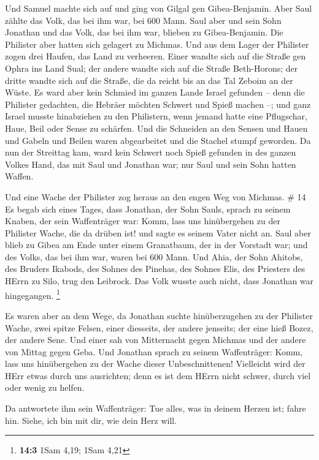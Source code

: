  Und Samuel machte sich auf und ging von Gilgal gen
Gibea-Benjamin. Aber Saul zählte das Volk, das bei ihm war, bei 600
Mann.  Saul aber und sein Sohn Jonathan und das Volk, das
bei ihm war, blieben zu Gibea-Benjamin. Die Philister aber hatten sich
gelagert zu Michmas.  Und aus dem Lager der Philister zogen
drei Haufen, das Land zu verheeren. Einer wandte sich auf die Straße gen
Ophra ins Land Sual;  der andere wandte sich auf die Straße
Beth-Horons; der dritte wandte sich auf die Straße, die da reicht bis an
das Tal Zeboim an der Wüste.  Es ward aber kein Schmied im
ganzen Lande Israel gefunden -- denn die Philister gedachten, die
Hebräer möchten Schwert und Spieß machen --;  und ganz
Israel musste hinabziehen zu den Philistern, wenn jemand hatte eine
Pflugschar, Haue, Beil oder Sense zu schärfen.  Und die
Schneiden an den Sensen und Hauen und Gabeln und Beilen waren
abgearbeitet und die Stachel stumpf geworden.  Da nun der
Streittag kam, ward kein Schwert noch Spieß gefunden in des ganzen
Volkes Hand, das mit Saul und Jonathan war; nur Saul und sein Sohn
hatten Waffen.

 Und eine Wache der Philister zog heraus an den engen Weg
von Michmas. \# 14  Es begab sich eines Tages, dass
Jonathan, der Sohn Sauls, sprach zu seinem Knaben, der sein Waffenträger
war: Komm, lass uns hinübergehen zu der Philister Wache, die da drüben
ist! und sagte es seinem Vater nicht an.  Saul aber blieb zu
Gibea am Ende unter einem Granatbaum, der in der Vorstadt war; und des
Volks, das bei ihm war, waren bei 600 Mann.  Und Ahia, der
Sohn Ahitobs, des Bruders Ikabods, des Sohnes des Pinehas, des Sohnes
Elis, des Priesters des HErrn zu Silo, trug den Leibrock. Das Volk
wusste auch nicht, dass Jonathan war hingegangen. \footnote{\textbf{14:3}
  1Sam 4,19; 1Sam 4,21}

 Es waren aber an dem Wege, da Jonathan suchte
hinüberzugehen zu der Philister Wache, zwei spitze Felsen, einer
diesseits, der andere jenseits; der eine hieß Bozez, der andere Sene.
 Und einer sah von Mitternacht gegen Michmas und der andere
von Mittag gegen Geba.  Und Jonathan sprach zu seinem
Waffenträger: Komm, lass uns hinübergehen zu der Wache dieser
Unbeschnittenen! Vielleicht wird der HErr etwas durch uns ausrichten;
denn es ist dem HErrn nicht schwer, durch viel oder wenig zu helfen.

 Da antwortete ihm sein Waffenträger: Tue alles, was in
deinem Herzen ist; fahre hin. Siehe, ich bin mit dir, wie dein Herz
will.

